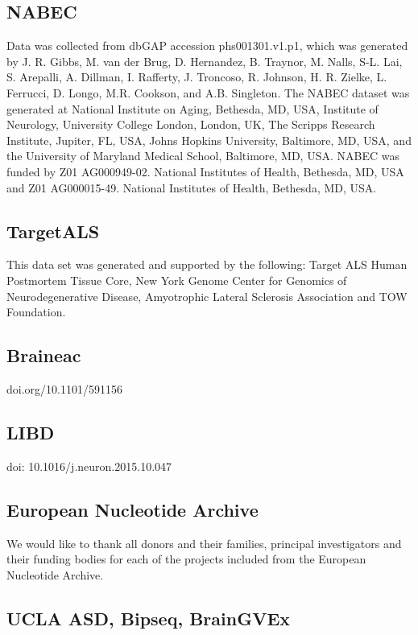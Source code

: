 \subsection*{NABEC}
Data was collected from dbGAP accession phs001301.v1.p1, which was generated by J. R. Gibbs, M. van der Brug, D. Hernandez, B. Traynor, M. Nalls, S-L. Lai, S. Arepalli, A. Dillman, I. Rafferty, J. Troncoso, R. Johnson, H. R. Zielke, L. Ferrucci, D. Longo, M.R. Cookson, and A.B. Singleton. The NABEC dataset was generated at National Institute on Aging, Bethesda, MD, USA, Institute of Neurology, University College London, London, UK, The Scripps Research Institute, Jupiter, FL, USA, Johns Hopkins University, Baltimore, MD, USA, and the University of Maryland Medical School, Baltimore, MD, USA. NABEC was funded by Z01 AG000949-02. National Institutes of Health, Bethesda, MD, USA and Z01 AG000015-49. National Institutes of Health, Bethesda, MD, USA. 

\subsection*{TargetALS}

This data set was generated and supported by the following: Target ALS Human Postmortem Tissue Core, New York Genome Center for Genomics of Neurodegenerative Disease, Amyotrophic Lateral Sclerosis Association and TOW Foundation. 

\subsection*{Braineac}

doi.org/10.1101/591156 

\subsection*{LIBD}

doi: 10.1016/j.neuron.2015.10.047 


\subsection*{European Nucleotide Archive }

We would like to thank all donors and their families, principal investigators and their funding bodies for each of the projects included from the European Nucleotide Archive.  

\subsection*{UCLA ASD, Bipseq, BrainGVEx}

